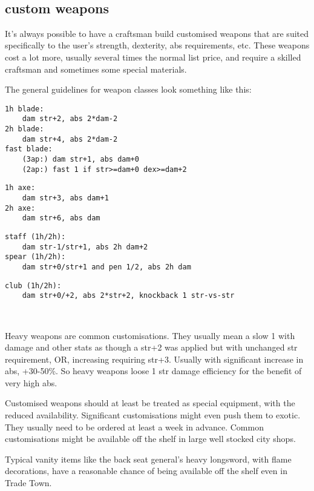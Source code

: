\

\subsection*{custom weapons}
It's always possible to have a craftsman build customised weapons that are suited specifically to the user's strength, dexterity, abs requirements, etc. These weapons cost a lot more, usually several times the normal list price, and require a skilled craftsman and sometimes some special materials.

The general guidelines for weapon classes look something like this:\\
\small \begin{samepage} \begin{verbatim}
1h blade:
    dam str+2, abs 2*dam-2
2h blade:
    dam str+4, abs 2*dam-2
fast blade:
    (3ap:) dam str+1, abs dam+0
    (2ap:) fast 1 if str>=dam+0 dex>=dam+2
\end{verbatim} \blocklistgap \begin{verbatim}
1h axe:
    dam str+3, abs dam+1
2h axe:
    dam str+6, abs dam
\end{verbatim} \blocklistgap \begin{verbatim}
staff (1h/2h):
    dam str-1/str+1, abs 2h dam+2
spear (1h/2h):
    dam str+0/str+1 and pen 1/2, abs 2h dam
\end{verbatim} \blocklistgap \begin{verbatim}
club (1h/2h):
    dam str+0/+2, abs 2*str+2, knockback 1 str-vs-str
\end{verbatim} \end{samepage} \normalsize \goodbreak

\

Heavy weapons are common customisations. They usually mean a slow 1 with damage and other stats as though a str+2 was applied but with unchanged str requirement, OR, increasing requiring str+3. Usually with significant increase in abs, +30-50\%. So heavy weapons loose 1 str damage efficiency for the benefit of very high abs.

Customised weapons should at least be treated as special equipment, with the reduced availability. Significant customisations might even push them to exotic. They usually need to be ordered at least a week in advance. Common customisations might be available off the shelf in large well stocked city shops.

Typical vanity items like the back seat general's heavy longsword, with flame decorations, have a reasonable chance of being available off the shelf even in Trade Town.

